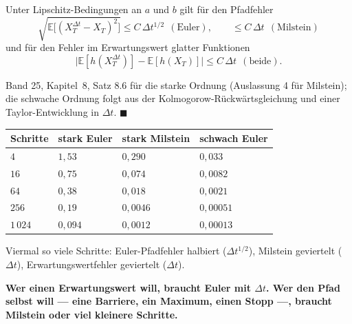 \begin{merksatz}
Unter Lipschitz-Bedingungen an $a$ und $b$ gilt für den Pfadfehler
\[ \sqrt{\mathbb E\big[(X_T^{\Delta t} - X_T)^2\big]} \le C\,\Delta t^{1/2} \ \ (\text{Euler}), \qquad \le C\,\Delta t \ \ (\text{Milstein}) \]
und für den Fehler im Erwartungswert glatter Funktionen
\[ \big|\mathbb E[h(X_T^{\Delta t})] - \mathbb E[h(X_T)]\big| \le C\,\Delta t \ \ (\text{beide}). \]

Band 25, Kapitel~8, Satz 8.6 für die starke Ordnung (Auslassung 4 für Milstein); die schwache Ordnung folgt aus der Kolmogorow-Rückwärtsgleichung und einer Taylor-Entwicklung in $\Delta t$. $\blacksquare$

\begin{center}
{\small
\renewcommand{\arraystretch}{1.48}
\begin{tabular}{@{}P{1.4cm}P{2.2cm}P{2.2cm}P{2.6cm}@{}}
\toprule
\textbf{Schritte} & \textbf{stark Euler} & \textbf{stark Milstein} & \textbf{schwach Euler}\\
\midrule
$4$ & $1{,}53$ & $0{,}290$ & $0{,}033$\\
$16$ & $0{,}75$ & $0{,}074$ & $0{,}0082$\\
$64$ & $0{,}38$ & $0{,}018$ & $0{,}0021$\\
$256$ & $0{,}19$ & $0{,}0046$ & $0{,}00051$\\
$1\,024$ & $0{,}094$ & $0{,}0012$ & $0{,}00013$\\
\bottomrule
\end{tabular}}
\end{center}
Viermal so viele Schritte: Euler-Pfadfehler halbiert ($\Delta t^{1/2}$), Milstein geviertelt ($\Delta t$), Erwartungswertfehler geviertelt ($\Delta t$).

\begin{center}
\begin{minipage}{0.9\textwidth}
\textbf{Wer einen Erwartungswert will, braucht Euler mit $\Delta t$. Wer den Pfad selbst will --- eine Barriere, ein Maximum, einen Stopp ---, braucht Milstein oder viel kleinere Schritte.}
\end{minipage}
\end{center}

\begin{center}
\begin{minipage}{0.88\textwidth}
\end{minipage}
\end{center}
\end{merksatz}

